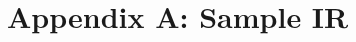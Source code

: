\documentclass{article}
\begin{document}



\clearpage
\section{Appendix A: Sample IR}
\label{sec:AppendixA}

\vspace{0.125in}



\clearpage




\end{document}
